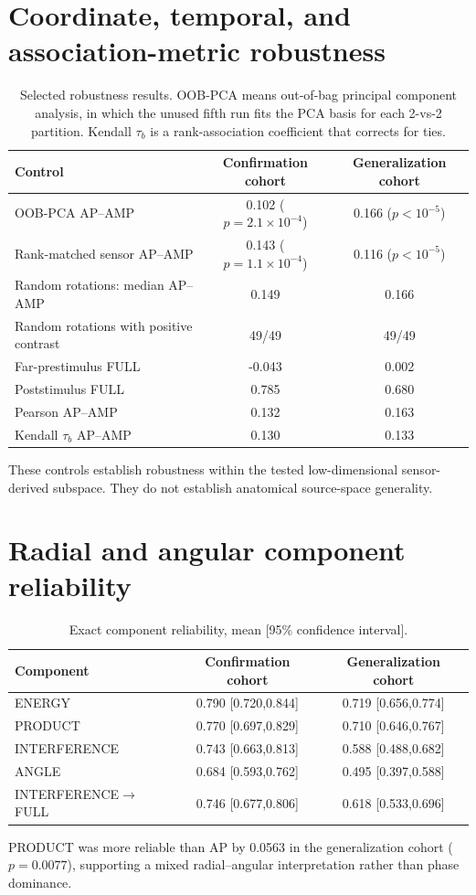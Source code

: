 \documentclass[11pt]{article}
\begin{document}
\section{Coordinate, temporal, and association-metric robustness}
\begin{table}[h]
\centering
\caption{Selected robustness results. OOB-PCA means out-of-bag principal component analysis, in which the unused fifth run fits the PCA basis for each 2-vs-2 partition. Kendall $\tau_b$ is a rank-association coefficient that corrects for ties.}
\begin{tabular}{lcc}
\toprule
Control & Confirmation cohort & Generalization cohort\\
\midrule
OOB-PCA AP--AMP & 0.102 ($p=2.1\times10^{-4}$) & 0.166 ($p<10^{-5}$)\\
Rank-matched sensor AP--AMP & 0.143 ($p=1.1\times10^{-4}$) & 0.116 ($p<10^{-5}$)\\
Random rotations: median AP--AMP & 0.149 & 0.166\\
Random rotations with positive contrast & 49/49 & 49/49\\
Far-prestimulus FULL & -0.043 & 0.002\\
Poststimulus FULL & 0.785 & 0.680\\
Pearson AP--AMP & 0.132 & 0.163\\
Kendall $\tau_b$ AP--AMP & 0.130 & 0.133\\
\bottomrule
\end{tabular}
\end{table}
These controls establish robustness within the tested low-dimensional sensor-derived subspace. They do not establish anatomical source-space generality.

\section{Radial and angular component reliability}
\begin{table}[h]
\centering
\caption{Exact component reliability, mean [95\% confidence interval].}
\begin{tabular}{lcc}
\toprule
Component & Confirmation cohort & Generalization cohort\\
\midrule
ENERGY & 0.790 [0.720,0.844] & 0.719 [0.656,0.774]\\
PRODUCT & 0.770 [0.697,0.829] & 0.710 [0.646,0.767]\\
INTERFERENCE & 0.743 [0.663,0.813] & 0.588 [0.488,0.682]\\
ANGLE & 0.684 [0.593,0.762] & 0.495 [0.397,0.588]\\
INTERFERENCE$\rightarrow$FULL & 0.746 [0.677,0.806] & 0.618 [0.533,0.696]\\
\bottomrule
\end{tabular}
\end{table}
PRODUCT was more reliable than AP by 0.0563 in the generalization cohort ($p=0.0077$), supporting a mixed radial--angular interpretation rather than phase dominance.
\end{document}
